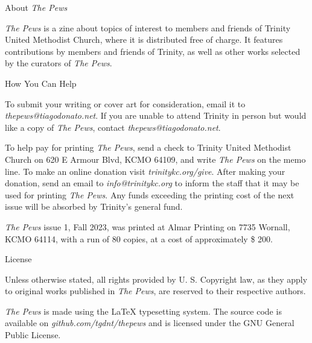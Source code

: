 \vspace*{\fill}

\hspace{-2em}\small About \emph{The Pews}

\vspace{0.5em}
\scriptsize \emph{The Pews} is a zine about topics of interest to
members and friends of Trinity United Methodist Church, where
it is distributed free of charge. It features contributions by
members and friends of Trinity, as well as other works
selected by the curators of \emph{The Pews}.

\vspace{1.5em}
\hspace{-2em}\small How You Can Help

\vspace{0.5em} \scriptsize To submit your writing or cover art
for consideration, email it to
\emph{thepews@tiagodonato.net}. If you are unable to attend
Trinity in person but would like a copy of \emph{The Pews},
contact \emph{thepews@tiagodonato.net}.

To help pay for printing \emph{The Pews}, send a check to
Trinity United Methodist Church on 620 E Armour Blvd, KCMO
64109, and write \emph{The Pews} on the memo line. To make an
online donation visit \emph{trinitykc.org/give}. After making
your donation, send an email to \emph{info@trinitykc.org} to
inform the staff that it may be used for printing \emph{The
Pews}. Any funds exceeding the printing cost of the next issue
will be absorbed by Trinity's general fund.

\emph{The Pews} issue 1, Fall 2023, was printed at Almar
Printing on 7735 Wornall, KCMO 64114, with a run of 80 copies,
at a cost of approximately \$ 200.

\vspace{1.5em}
\hspace{-2em}\small License

\vspace{0.5em}
\scriptsize Unless otherwise stated, all rights provided by
U. S. Copyright law, as they apply to original works published
in \emph{The Pews}, are reserved to their respective authors.

\emph{The Pews} is made using the \LaTeX{} typesetting
system. The source code is available on
\emph{github.com/tgdnt/thepews} and is licensed under the GNU
General Public License.